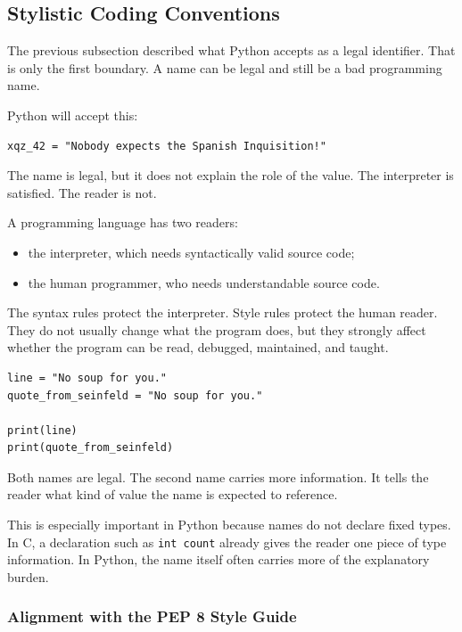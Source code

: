 \subsection{Stylistic Coding Conventions}

The previous subsection described what Python accepts as a legal identifier. That is only the first boundary. A name can be legal and still be a bad programming name.

Python will accept this:

\begin{verbatim}
xqz_42 = "Nobody expects the Spanish Inquisition!"
\end{verbatim}

The name is legal, but it does not explain the role of the value. The interpreter is satisfied. The reader is not.

A programming language has two readers:

\begin{itemize}
    \item the interpreter, which needs syntactically valid source code;
    \item the human programmer, who needs understandable source code.
\end{itemize}

The syntax rules protect the interpreter. Style rules protect the human reader. They do not usually change what the program does, but they strongly affect whether the program can be read, debugged, maintained, and taught.

\begin{verbatim}
line = "No soup for you."
quote_from_seinfeld = "No soup for you."

print(line)
print(quote_from_seinfeld)
\end{verbatim}

Both names are legal. The second name carries more information. It tells the reader what kind of value the name is expected to reference.

This is especially important in Python because names do not declare fixed types. In C, a declaration such as \texttt{int count} already gives the reader one piece of type information. In Python, the name itself often carries more of the explanatory burden.

\subsubsection{Alignment with the PEP 8 Style Guide}

